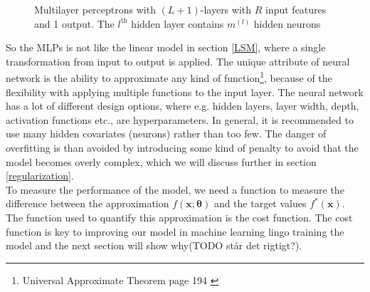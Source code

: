 \begin{figure}[th]
	\caption[Multilayer Perceptrons with $(L+1)$-layers]{Multilayer perceptrons with $(L+1)$-layers with $R$ input features and 1 output. The $l^{\text{th}}$ hidden layer contains $m^{(l)}$ hidden neurons}
	\label{fig:multilayer-perceptron}
\end{figure}

So the MLPs is not like the linear model in section \ref{LSM}, where a single transformation from input to output is applied. The unique attribute of neural network is the ability to approximate any kind of function\footnote{Universal Approximate Theorem page 194 \parencite{Goodfellow-et-al-2016}}, because of the flexibility with applying multiple functions to the input layer. The neural network has a lot of different design options, where e.g. hidden layers, layer width, depth, activation functions etc., are hyperparameters. In general, it is recommended to use many hidden covariates (neurons) rather than too few. The danger of overfitting is than avoided by introducing some kind of penalty to avoid that the model becomes overly complex, which we will discuss further in section \ref{regularization}.\\

To measure the performance of the model, we need a function to measure the difference between the approximation $f(\bm{x};\bm{\theta})$ and the target values $f^*(\bm{x})$. The function used to quantify this approximation is the cost function. The cost function is key to improving our model in machine learning lingo training the model and the next section will show why(TODO står det rigtigt?).

